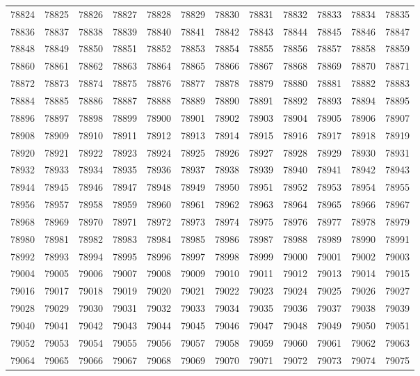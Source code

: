 \begin{center}
\begin{longtable}{llllllllllll}
78824 &78825 &78826 &78827 &78828 &78829 &78830 &78831 &78832 &78833 &78834 &78835 \\
78836 &78837 &78838 &78839 &78840 &78841 &78842 &78843 &78844 &78845 &78846 &78847 \\
78848 &78849 &78850 &78851 &78852 &78853 &78854 &78855 &78856 &78857 &78858 &78859 \\
78860 &78861 &78862 &78863 &78864 &78865 &78866 &78867 &78868 &78869 &78870 &78871 \\
78872 &78873 &78874 &78875 &78876 &78877 &78878 &78879 &78880 &78881 &78882 &78883 \\
78884 &78885 &78886 &78887 &78888 &78889 &78890 &78891 &78892 &78893 &78894 &78895 \\
78896 &78897 &78898 &78899 &78900 &78901 &78902 &78903 &78904 &78905 &78906 &78907 \\
78908 &78909 &78910 &78911 &78912 &78913 &78914 &78915 &78916 &78917 &78918 &78919 \\
78920 &78921 &78922 &78923 &78924 &78925 &78926 &78927 &78928 &78929 &78930 &78931 \\
78932 &78933 &78934 &78935 &78936 &78937 &78938 &78939 &78940 &78941 &78942 &78943 \\
78944 &78945 &78946 &78947 &78948 &78949 &78950 &78951 &78952 &78953 &78954 &78955 \\
78956 &78957 &78958 &78959 &78960 &78961 &78962 &78963 &78964 &78965 &78966 &78967 \\
78968 &78969 &78970 &78971 &78972 &78973 &78974 &78975 &78976 &78977 &78978 &78979 \\
78980 &78981 &78982 &78983 &78984 &78985 &78986 &78987 &78988 &78989 &78990 &78991 \\
78992 &78993 &78994 &78995 &78996 &78997 &78998 &78999 &79000 &79001 &79002 &79003 \\
79004 &79005 &79006 &79007 &79008 &79009 &79010 &79011 &79012 &79013 &79014 &79015 \\
79016 &79017 &79018 &79019 &79020 &79021 &79022 &79023 &79024 &79025 &79026 &79027 \\
79028 &79029 &79030 &79031 &79032 &79033 &79034 &79035 &79036 &79037 &79038 &79039 \\
79040 &79041 &79042 &79043 &79044 &79045 &79046 &79047 &79048 &79049 &79050 &79051 \\
79052 &79053 &79054 &79055 &79056 &79057 &79058 &79059 &79060 &79061 &79062 &79063 \\
79064 &79065 &79066 &79067 &79068 &79069 &79070 &79071 &79072 &79073 &79074 &79075 \\

\end{longtable}
\end{center}

